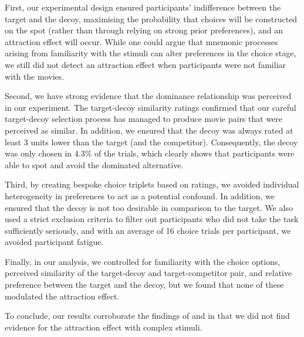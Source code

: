 \documentclass[12pt, a4paper]{article}
\begin{document}
First, our experimental design ensured participants' indifference between the target and the decoy, maximising the probability that choices will be constructed on the spot (rather than through relying on strong prior preferences), and an attraction effect will occur. While one could argue that mnemonic processes arising from familiarity with the stimuli can alter preferences in the choice stage, we still did not detect an attraction effect when participants were not familiar with the movies.

Second, we have strong evidence that the dominance relationship was perceived in our experiment. The target-decoy similarity ratings confirmed that our careful target-decoy selection process has managed to produce movie pairs that were perceived as similar. In addition, we ensured that the decoy was always rated at least 3 units lower than the target (and the competitor). Consequently, the decoy was only chosen in 4.3\% of the trials, which clearly shows that participants were able to spot and avoid the dominated alternative.

Third, by creating bespoke choice triplets based on ratings, we avoided individual heterogeneity in preferences to act as a potential confound. In addition, we ensured that the decoy is not too desirable in comparison to the target. We also used a strict exclusion criteria to filter out participants who did not take the task sufficiently seriously, and with an average of 16 choice trials per participant, we avoided participant fatigue.


Finally, in our analysis, we controlled for familiarity with the choice options, perceived similarity of the target-decoy and target-competitor pair, and relative preference between the target and the decoy, but we found that none of these modulated the attraction effect.


To conclude, our results corroborate the findings of \citeauthor{Frederick2014} and \citeauthor{Yang2014} in that we did not find evidence for the attraction effect with complex stimuli.





\newpage


\end{document}
